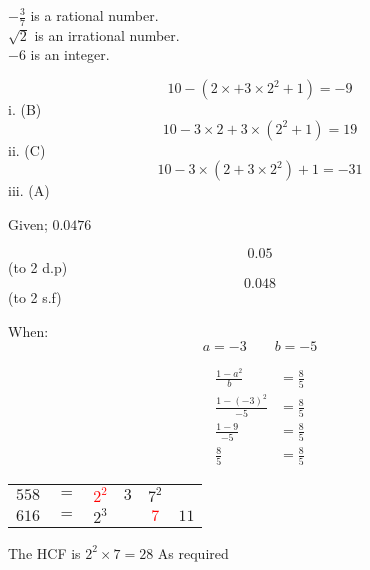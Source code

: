 \documentclass[a4paper]{tufte-handout}
\begin{document}

\begin{question}

\qpart
$-\frac{3}{7}$ is a rational number.\\
\bigskip
$\sqrt{2}$ is an irrational number.\\
\bigskip
$-6$ is an integer.\\

\vspace{1.5cm}

\qpart
\qsubpart
\[10-(2\times+3\times2^2+1)=-9\]
\hfill i. (B)\\
\qsubpart
\[10-3\times2+3\times(2^2+1)=19\]
\hfill ii. (C)\\
\qsubpart
\[10-3\times(2+3\times2^2)+1=-31\]
\hfill iii. (A)

\vspace{1.5cm}

\qpart 
Given; $0.0476$

\qsubpart
\[0.05\]\hfill (to 2 d.p)\\
\qsubpart
\[0.048\]\hfill (to 2 s.f)

\pagebreak

\qpart
When:
\[a=-3 \qquad b=-5\]

\begin{align*}
\frac{1-a^2}{b} &= \frac{8}{5}\\[8pt]
\frac{1-(-3)^2}{-5} &= \frac{8}{5}\\[8pt]
\frac{1-9}{-5} &= \frac{8}{5}\\[8pt]
\frac{8}{5} &= \frac{8}{5}
\end{align*}
\hfill {}

\vspace{1.5cm}

\qpart

\begin{tabular}{cccccc}
$558$&$=$&\textcolor{red}{$2^2$}&$3$&$7^2$& \\
$616$&$=$&$2^3$&&\textcolor{red}{$7$}&$11$
\end{tabular}

The HCF is $2^2\times7=28$
\hfill As required


\end{question}
\end{document}
